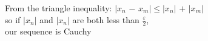 \documentclass[preview]{standalone}
\begin{document}
\begin{center}
From the triangle inequality: $|$$x_n$ $-$ $x_m$$|$$\leq$$|$$x_n$$|$ $+$ $|$$x_m$$|$\\so if $|x_n|$ and $|x_n|$ are both less than $\frac{\varepsilon}{2}$,\\our sequence is Cauchy
\end{center}
\end{document}
